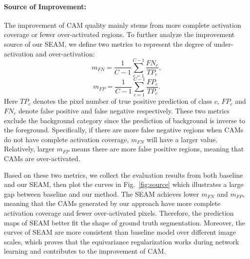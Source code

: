 \documentclass[10pt,twocolumn,letterpaper]{article}
\begin{document}
\paragraph{Source of Improvement:}
	The improvement of CAM quality mainly stems from more complete activation coverage or fewer over-activated regions. To further analyze the improvement source of our SEAM, we define two metrics to represent the degree of under-activation and over-activation:
	\begin{equation}\label{eq:mfn}
	m_{\mathit{FN}} =\frac{1}{C-1}\sum_{c=1}^{C-1}\frac{\mathit{FN}_c}{\mathit{TP}_c},
	\end{equation}
	\begin{equation}\label{eq:mfp}
	m_{\mathit{FP}} =\frac{1}{C-1}\sum_{c=1}^{C-1}\frac{\mathit{FP}_c}{\mathit{TP}_c}.
	\end{equation}
	Here $\mathit{TP}_c$ denotes the pixel number of true positive prediction of class $c$, $\mathit{FP}_c$ and $\mathit{FN}_c$ denote false positive and false negative respectively. These two metrics exclude the background category since the prediction of background is inverse to the foreground. Specifically, if there are more false negative regions when CAMs do not have complete activation coverage, $m_{\mathit{FN}}$ will have a larger value. Relatively, larger $m_{\mathit{FP}}$ means there are more false positive regions, meaning that CAMs are over-activated.
	
	Based on these two metrics, we collect the evaluation results from both baseline and our SEAM, then plot the curves in Fig.~\ref{fig:source} which illustrates a large gap between baseline and our method. The SEAM achieves lower $m_{\mathit{FN}}$ and $m_{\mathit{FP}}$, meaning that the CAMs generated by our approach have more complete activation coverage and fewer over-activated pixels. Therefore, the prediction maps of SEAM better fit the shape of ground truth segmentation. Moreover, the curves of SEAM are more consistent than baseline model over different image scales, which proves that the equivariance regularization works during network learning and contributes to the improvement of CAM.
	
\end{document}
